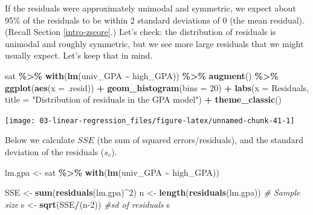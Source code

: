\documentclass[
]{book}
\newenvironment{Shaded}{\begin{snugshade}}{\end{snugshade}}
\newcommand{\AttributeTok}[1]{\textcolor[rgb]{0.13,0.29,0.53}{#1}}
\newcommand{\CommentTok}[1]{\textcolor[rgb]{0.56,0.35,0.01}{\textit{#1}}}
\newcommand{\DecValTok}[1]{\textcolor[rgb]{0.00,0.00,0.81}{#1}}
\newcommand{\FunctionTok}[1]{\textcolor[rgb]{0.13,0.29,0.53}{\textbf{#1}}}
\newcommand{\NormalTok}[1]{#1}
\newcommand{\OtherTok}[1]{\textcolor[rgb]{0.56,0.35,0.01}{#1}}
\newcommand{\SpecialCharTok}[1]{\textcolor[rgb]{0.81,0.36,0.00}{\textbf{#1}}}
\newcommand{\StringTok}[1]{\textcolor[rgb]{0.31,0.60,0.02}{#1}}
\begin{document}
If the residuals were approximately unimodal and symmetric, we expect about 95\% of the residuals to be within 2 standard deviations of 0 (the mean residual). (Recall Section \ref{intro-zscore}.) Let's check: the distribution of residuals is unimodal and roughly symmetric, but we see more large residuals that we might usually expect. Let's keep that in mind.

\begin{Shaded}
\begin{Highlighting}[]
\NormalTok{sat }\SpecialCharTok{\%\textgreater{}\%}
  \FunctionTok{with}\NormalTok{(}\FunctionTok{lm}\NormalTok{(univ\_GPA }\SpecialCharTok{\textasciitilde{}}\NormalTok{ high\_GPA)) }\SpecialCharTok{\%\textgreater{}\%}
  \FunctionTok{augment}\NormalTok{() }\SpecialCharTok{\%\textgreater{}\%}
  \FunctionTok{ggplot}\NormalTok{(}\FunctionTok{aes}\NormalTok{(}\AttributeTok{x =}\NormalTok{ .resid)) }\SpecialCharTok{+}
  \FunctionTok{geom\_histogram}\NormalTok{(}\AttributeTok{bins =} \DecValTok{20}\NormalTok{) }\SpecialCharTok{+}
  \FunctionTok{labs}\NormalTok{(}\AttributeTok{x =} \StringTok{\textquotesingle{}Residuals\textquotesingle{}}\NormalTok{, }\AttributeTok{title =}  \StringTok{"Distribution of residuals in the GPA model"}\NormalTok{) }\SpecialCharTok{+}
  \FunctionTok{theme\_classic}\NormalTok{()}
\end{Highlighting}
\end{Shaded}

\begin{center}\texttt{[image: 03-linear-regression\_files/figure-latex/unnamed-chunk-41-1]} \end{center}

Below we calculate \(SSE\) (the sum of squared errors/residuals), and the standard deviation of the residuals (\(s_e\)).

\begin{Shaded}
\begin{Highlighting}[]
\NormalTok{lm.gpa }\OtherTok{\textless{}{-}}\NormalTok{ sat }\SpecialCharTok{\%\textgreater{}\%}
  \FunctionTok{with}\NormalTok{(}\FunctionTok{lm}\NormalTok{(univ\_GPA }\SpecialCharTok{\textasciitilde{}}\NormalTok{ high\_GPA))}

\NormalTok{SSE }\OtherTok{\textless{}{-}} \FunctionTok{sum}\NormalTok{(}\FunctionTok{residuals}\NormalTok{(lm.gpa)}\SpecialCharTok{\^{}}\DecValTok{2}\NormalTok{)}
\NormalTok{n }\OtherTok{\textless{}{-}} \FunctionTok{length}\NormalTok{(}\FunctionTok{residuals}\NormalTok{(lm.gpa)) }\CommentTok{\# Sample size}
\NormalTok{s }\OtherTok{\textless{}{-}} \FunctionTok{sqrt}\NormalTok{(SSE}\SpecialCharTok{/}\NormalTok{(n}\DecValTok{{-}2}\NormalTok{)) }\CommentTok{\#sd of residuals}
\NormalTok{s}
\end{Highlighting}
\end{Shaded}
\end{document}
